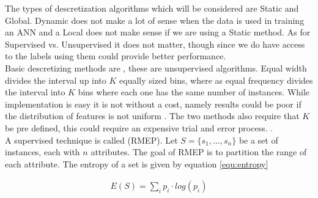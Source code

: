 The types of descretization algorithms which will be considered are Static and Global. Dynamic does not make a lot of sense when the data is used in training an ANN and a Local does not make sense if we are using a Static method. As for Supervised vs. Unsupervised it does not matter, though since we do have access to the labels using them could provide better performance.\\

Basic descretizing methods are , these are unsupervised algorithms. Equal width divides the interval up into $K$ equally sized bins, where as equal frequency divides the interval into $K$ bins where each one has the same number of instances. While implementation is easy it is not without a cost, namely results could be poor if the distribution of features is not uniform \cite{liu2002discretization}. The two methods also require that $K$ be pre defined, this could require an expensive trial and error process. \cite{liu2002discretization}.\\

A supervised technique is called  (RMEP). Let $S = \{s_1, ..., s_n\}$ be a set of instances, each with $n$ attributes. The goal of RMEP is to partition the range of each attribute. The entropy of a set is given by equation \ref{equ:entropy}

\begin{align}
	E(S) = \sum_{i} p_i \cdot log(p_i)
	\label{equ:entropy}
\end{align}

